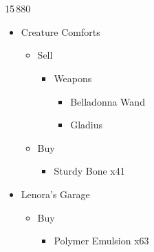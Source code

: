 \chapter[Chapter 6]{}


\begin{shop}{15\,880}
  \begin{multicols}{2}
    \begin{itemize}
      \item Creature Comforts
            \begin{itemize}
              \item Sell
                    \begin{itemize}
                      \item Weapons
                            \begin{itemize}
                              \item Belladonna Wand
                              \item Gladius
                            \end{itemize}
                    \end{itemize}
              \item Buy
                    \begin{itemize}
                      \item Sturdy Bone x41
                    \end{itemize}
            \end{itemize}
            \columnbreak
      \item Lenora's Garage
            \begin{itemize}
              \item Buy
                    \begin{itemize}
                      \item Polymer Emulsion x63
                    \end{itemize}
            \end{itemize}
    \end{itemize}
  \end{multicols}
\end{shop}

